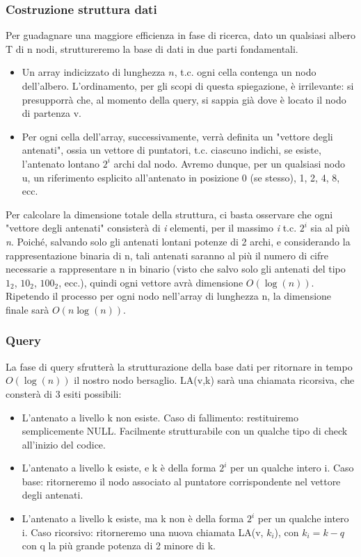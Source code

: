 \documentclass{article}
\begin{document}
\subsubsection{Costruzione struttura dati}
Per guadagnare una maggiore efficienza in fase di ricerca, dato un qualsiasi albero T di n nodi, struttureremo la base di dati in due parti fondamentali.
\begin{itemize}
	\item Un array indicizzato di lunghezza $n$, t.c. ogni cella contenga un nodo dell'albero. L'ordinamento, per gli scopi di questa spiegazione, è irrilevante: si presupporrà che, al momento della query, si sappia già dove è locato il nodo di partenza v.
	\item Per ogni cella dell'array, successivamente, verrà definita un "vettore degli antenati", ossia un vettore di puntatori, t.c. ciascuno indichi, se esiste, l'antenato lontano $2^i$ archi
	dal nodo. 
	Avremo dunque, per un qualsiasi nodo u, un riferimento esplicito all'antenato in posizione 0 (se stesso), 1, 2, 4, 8, ecc.
\end{itemize}

Per calcolare la dimensione totale della struttura, ci basta osservare che ogni "vettore degli antenati" consisterà di \textit{i} elementi, per il massimo \textit{i} t.c. $2^i$ sia al più \textit{n}. Poiché, salvando solo gli antenati lontani potenze di 2 archi, e considerando la rappresentazione binaria di n, tali antenati saranno al più il numero di cifre necessarie a rappresentare n in binario (visto che salvo solo gli antenati del tipo $1_2$, $10_2$, $100_2$, ecc.), quindi ogni vettore avrà dimensione $O(\log(n))$. Ripetendo il processo per ogni nodo nell'array di lunghezza n, la dimensione finale sarà $O(n\log(n))$.

\subsubsection{Query}
La fase di query sfrutterà la strutturazione della base dati per ritornare in tempo $O(\log(n))$ il nostro nodo bersaglio. 
LA(v,k) sarà una chiamata ricorsiva, che consterà di 3 esiti possibili:
\begin{itemize}
	\item L'antenato a livello k non esiste. Caso di fallimento: restituiremo semplicemente NULL. Facilmente strutturabile con un qualche tipo di check all'inizio del codice.
	\item L'antenato a livello k esiste, e k è della forma $2^i$ per un qualche intero i. Caso base: ritorneremo il nodo associato al puntatore corrispondente nel vettore degli antenati.
	\item L'antenato a livello k esiste, ma k non è della forma $2^i$ per un qualche intero i. Caso ricorsivo: ritorneremo una nuova chiamata LA(v, $k_i$), con $k_i = k - q$ con q la più grande potenza di 2 minore di k.
\end{itemize}
\end{document}
